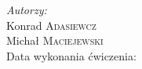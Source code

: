 \begin{titlepage}

\flushright
\Large \emph{Autorzy:}\\
Konrad \textsc{Adasiewcz}\\[0.1cm] %
Michał \textsc{Maciejewski}\\[3cm] %

Data wykonania ćwiczenia: \\
{\large {}}\\[1cm]

\vfill %

\end{titlepage}
